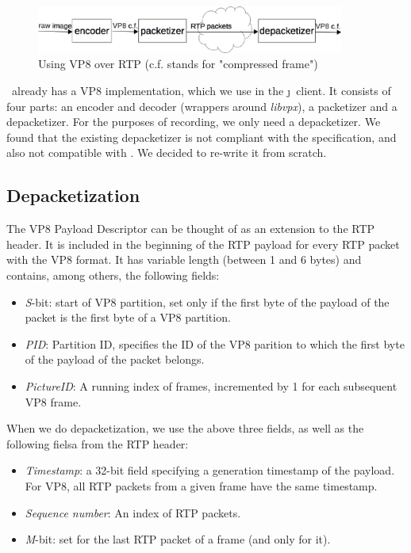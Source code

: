 \documentclass[twoside,openright,a4paper,12pt,english]{article}
\begin{document}
\begin{figure}[h]
    \includegraphics[width=0.9\textwidth]{./pics/vp8.eps}
    \caption{Using VP8 over RTP (c.f. stands for "compressed frame")}
    \label{vp8-scheme}
\end{figure}

\lj\ already has a VP8 implementation, which we use in the \j\ client. It
consists of four parts: an encoder and decoder (wrappers around \emph{libvpx}),
a packetizer and a depacketizer. For the purposes of recording, we only need 
a depacketizer. We found that the existing depacketizer is not compliant with
the specification, and also not compatible with \wrtc. We decided to re-write it from scratch.

\subsection{Depacketization}
\label{depacketizer}
The VP8 Payload Descriptor can be thought of as an extension to the RTP header.
It is included in the beginning of the RTP payload for every RTP packet with
the VP8 format. It has variable length (between 1 and 6 bytes) and contains,
among others, the following fields:
\begin{itemize}
\item \emph{S}-bit: start of VP8 partition, set only if the first byte of the payload of the packet is the first byte of a VP8 partition.
\item \emph{PID}: Partition ID, specifies the ID of the VP8 parition to which the first byte of the payload of the packet belongs.
\item \emph{PictureID}: A running index of frames, incremented by 1 for each subsequent VP8 frame.
\end{itemize}

When we do depacketization, we use the above three fields, as well as the following fielsa
from the RTP header:
\begin{itemize}
\item \emph{Timestamp}: a 32-bit field specifying a generation timestamp of the payload. For VP8, all RTP packets from a given frame have the same timestamp.
\item \emph{Sequence number}: An index of RTP packets.
\item \emph{M}-bit: set for the last RTP packet of a frame (and only for it).
\end{itemize}
\end{document}
